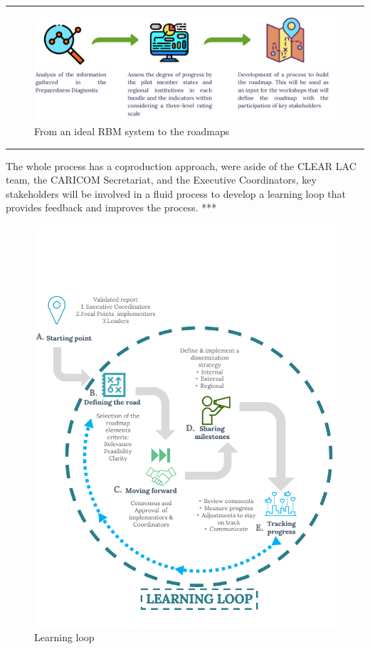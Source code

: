 \documentclass[
  10pt,
]{book}
\begin{document}
\begin{center}\rule{0.5\linewidth}{0.5pt}\end{center}

\begin{figure}

{\centering \includegraphics[width=1\linewidth]{./images/figure_6} 

}

\caption{From an ideal RBM system to the roadmaps}\label{fig:figure6}
\end{figure}

\begin{center}\rule{0.5\linewidth}{0.5pt}\end{center}

The whole process has a coproduction approach, were aside of the CLEAR LAC team, the CARICOM Secretariat, and the Executive Coordinators, key stakeholders will be involved in a fluid process to develop a learning loop that provides feedback and improves the process.
***

\begin{figure}

{\centering \includegraphics[width=0.75\linewidth]{./images/figure_7} 

}

\caption{Learning loop}\label{fig:figure7}
\end{figure}
\end{document}
